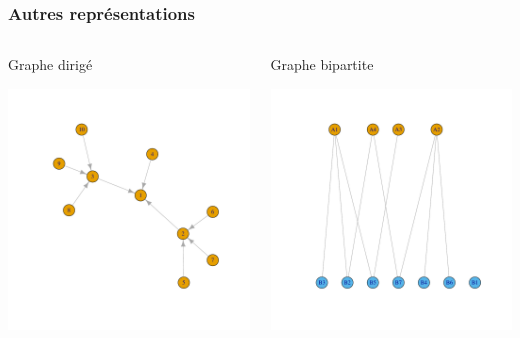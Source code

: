 \documentclass[nopagenumber,9pt]{beamer}
\begin{document}
\begin{frame}
 \frametitle{Autres représentations}
 
 \begin{columns}
  \begin{column}{.45\paperwidth}
   Graphe dirigé
   
   \centering
     \includegraphics[scale=.3]{plots/arbredirige.pdf}
  \end{column}
 \begin{column}{.45\paperwidth}
   Graphe bipartite
   
    \centering
     \includegraphics[scale=.3]{plots/graphe_bipartite.pdf}
  \end{column}
 \end{columns}

 
\end{frame}
\end{document}
